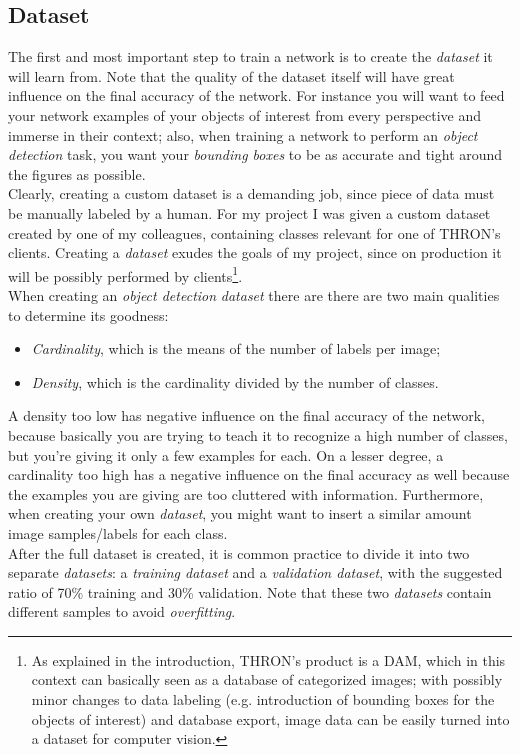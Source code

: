 	\subsection{Dataset}
	The first and most important step to train a network is to create the \emph{dataset} it will learn from. Note that the quality of the dataset itself will have great influence on the final accuracy of the network. For instance you will want to feed your network examples of your objects of interest from every perspective and immerse in their context; also, when training a network to perform an \emph{object detection} task, you want your \emph{bounding boxes} to be as accurate and tight around the figures as possible. \\
	Clearly, creating a custom dataset is a demanding job, since piece of data must be manually labeled by a human. For my project I was given a custom dataset created by one of my colleagues, containing classes relevant for one of THRON's clients. Creating a \emph{dataset} exudes the goals of my project, since on production it will be possibly performed by clients\footnote{As explained in the introduction, THRON's product is a DAM, which in this context can basically seen as a database of categorized images; with possibly minor changes to data labeling (e.g. introduction of bounding boxes for the objects of interest) and database export, image data can be easily turned into a dataset for computer vision.}. \\
	When creating an \emph{object detection} \emph{dataset} there are there are two main qualities to determine its goodness:
	\begin{itemize}
		\item \emph{Cardinality}, which is the means of the number of labels per image;
		\item \emph{Density}, which is the cardinality divided by the number of classes.
	\end{itemize}
A density too low has negative influence on the final accuracy of the network, because basically you are trying to teach it to recognize a high number of classes, but you're giving it only a few examples for each. On a lesser degree, a cardinality too high has  a negative influence on the final accuracy as well because the examples you are giving are too cluttered with information. Furthermore, when creating your own \emph{dataset}, you might want to insert a similar amount image samples/labels for each class. \\
After the full dataset is created, it is common practice to divide it into two separate \emph{datasets}: a \emph{training dataset} and a \emph{validation dataset}, with the suggested ratio of 70\% training and 30\% validation. Note that these two \emph{datasets} contain different samples to avoid \emph{\gls{overfitting}}\glsfirstoccur.

